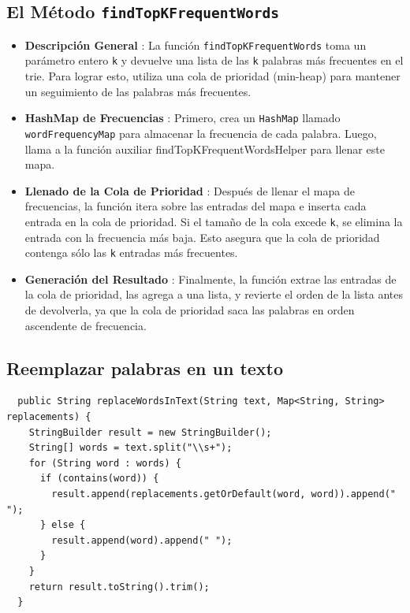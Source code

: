 \documentclass[11pt, a4paper]{article}
\begin{document}
\subsection{El Método \texttt{findTopKFrequentWords}}
\begin{itemize}
  \item \textbf{Descripción General} : La función \texttt{findTopKFrequentWords} toma un parámetro entero \texttt{k} y devuelve una lista de las \texttt{k} palabras más frecuentes en el trie. Para lograr esto, utiliza una cola de prioridad (min-heap) para mantener un seguimiento de las palabras más frecuentes.
  \item \textbf{HashMap de Frecuencias} : Primero, crea un \texttt{HashMap} llamado \texttt{wordFrequencyMap} para almacenar la frecuencia de cada palabra. Luego, llama a la función auxiliar {findTopKFrequentWordsHelper} para llenar este mapa.
  \item \textbf{Llenado de la Cola de Prioridad} : Después de llenar el mapa de frecuencias, la función itera sobre las entradas del mapa e inserta cada entrada en la cola de prioridad. Si el tamaño de la cola excede \texttt{k}, se elimina la entrada con la frecuencia más baja. Esto asegura que la cola de prioridad contenga sólo las \texttt{k} entradas más frecuentes.
  \item \textbf{Generación del Resultado} : Finalmente, la función extrae las entradas de la cola de prioridad, las agrega a una lista, y revierte el orden de la lista antes de devolverla, ya que la cola de prioridad saca las palabras en orden ascendente de frecuencia.
\end{itemize}

\subsection{Reemplazar palabras en un texto}

\begin{verbatim}
  public String replaceWordsInText(String text, Map<String, String> replacements) {
    StringBuilder result = new StringBuilder();
    String[] words = text.split("\\s+");
    for (String word : words) {
      if (contains(word)) {
        result.append(replacements.getOrDefault(word, word)).append(" ");
      } else {
        result.append(word).append(" ");
      }
    }
    return result.toString().trim();
  }
\end{verbatim}
\end{document}
